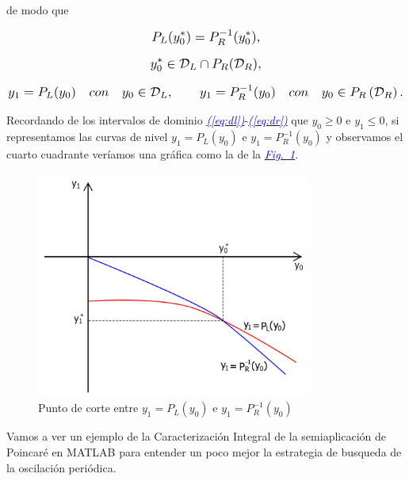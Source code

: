 \documentclass[12pt,a4paper]{report} %
\newcommand{\fref}[1]{\hyperref[#1]{\textcolor{blue}{\textit{Fig.~\ref*{#1}}}}}
\newcommand{\eref}[1]{\hyperref[#1]{\textcolor{blue}{\textit{(\ref*{#1})}}}}
\begin{document}
	\noindent de modo que
	
	\begin{equation*}
		\scalebox{1.2}{$\displaystyle
		P_L(y_0^*)=P_R^{-1}(y_0^*),
		$}
	\end{equation*}
	
	\begin{equation*}
		\scalebox{1.2}{$\displaystyle
		y_0^* \in \mathcal{D}_L \cap P_R(\mathcal{D}_R),
		$}
	\end{equation*}
	
	\begin{equation*}
		\scalebox{1.2}{$\displaystyle
			y_1=P_L(y_0) \quad con \quad y_0\in\mathcal{D}_L, \qquad y_1=P_R^{-1}(y_0) \quad con \quad y_0\in P_R\left(\mathcal{D}_R\right).
			$}
	\end{equation*}
	
	\vspace{0.5cm}\noindent Recordando de los intervalos de dominio \eref{eq:dl}-\eref{eq:dr} que $y_0\geq0$ e $y_1\leq0$, si representamos las curvas de nivel $y_1=P_L(y_0)$ e $y_1=P_R^{-1}(y_0)$ y observamos el cuarto cuadrante veríamos una gráfica como la de la \fref{fig:graficaejemplo}.
	
	\begin{figure}[h]
		\centering
		\includegraphics[width=0.8\textwidth]{graficaejemplo.jpg}
		\caption{Punto de corte entre $y_1=P_L(y_0)$ e $y_1=P_R^{-1}(y_0)$}
		\label{fig:graficaejemplo}
	\end{figure}\smallskip
	
	\newpage
	
	\vspace{0.5cm} Vamos a ver un ejemplo de la Caracterización Integral de la semiaplicación de Poincaré en MATLAB para entender un poco mejor la estrategia de busqueda de la oscilación periódica.
	
\end{document}

